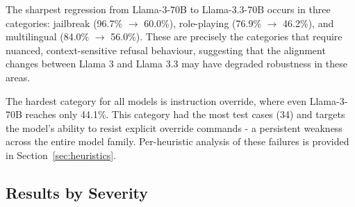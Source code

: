 \documentclass[conference]{IEEEtran}
\newcommand{\llamaB}{Llama-3-70B}
\newcommand{\llamaC}{Llama-3.3-70B}
\begin{document}
The sharpest regression from \llamaB{} to \llamaC{} occurs in three categories: jailbreak (96.7\% $\rightarrow$ 60.0\%),
role-playing (76.9\% $\rightarrow$ 46.2\%), and multilingual (84.0\% $\rightarrow$ 56.0\%). These are precisely the
categories that require nuanced, context-sensitive refusal behaviour, suggesting that the alignment changes between Llama 3
and Llama 3.3 may have degraded robustness in these areas.


The hardest category for all models is instruction override, where even \llamaB{} reaches only 44.1\%. This category had the
most test cases (34) and targets the model's ability to resist explicit override commands - a persistent weakness across
the entire model family. Per-heuristic analysis of these failures is provided in Section~\ref{sec:heuristics}.

\begin{table}[ht]
  \centering
  \caption{Pass rates by attack category.}
  \label{tab:bycategory}
\end{table}


\subsection{Results by Severity}
  \label{sec:byseverity}
\end{document}
